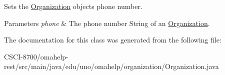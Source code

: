 Sets the \mbox{\hyperlink{classedu_1_1uno_1_1omahelp_1_1organization_1_1_organization}{Organization}} object\textquotesingle{}s phone number.


\begin{DoxyParams}{Parameters}
{\em phone} & The phone number String of an \mbox{\hyperlink{classedu_1_1uno_1_1omahelp_1_1organization_1_1_organization}{Organization}}. \\
\hline
\end{DoxyParams}


The documentation for this class was generated from the following file\+:\begin{DoxyCompactItemize}
\item 
C\+S\+C\+I-\/8700/omahelp-\/rest/src/main/java/edu/uno/omahelp/organization/Organization.\+java\end{DoxyCompactItemize}
